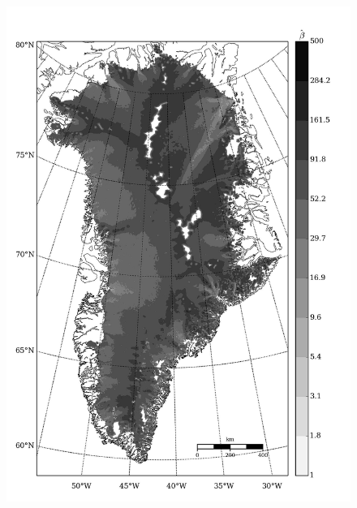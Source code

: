 \begin{figure}
  \centering
  \begin{minipage}[b]{0.47\linewidth}
    \includegraphics[width=1.0\textwidth]{images/greenland/stats/GLM_beta_no_stress.jpg}
  \end{minipage}
  \quad
  \begin{minipage}[b]{0.47\linewidth}

\end{minipage}
\end{figure}
